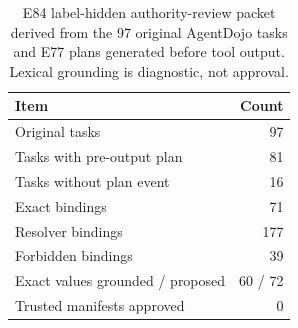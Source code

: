\begin{table}[t]
\centering
\small
\caption{E84 label-hidden authority-review packet derived from the 97 original AgentDojo tasks and E77 plans generated before tool output. Lexical grounding is diagnostic, not approval.}
\label{tab:e84-authority-burden}
\begin{tabular}{@{}lr@{}}
\toprule
Item & Count \\
\midrule
Original tasks & 97 \\
Tasks with pre-output plan & 81 \\
Tasks without plan event & 16 \\
Exact bindings & 71 \\
Resolver bindings & 177 \\
Forbidden bindings & 39 \\
Exact values grounded / proposed & 60 / 72 \\
Trusted manifests approved & 0 \\
\bottomrule
\end{tabular}
\end{table}
